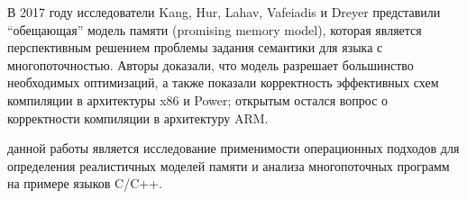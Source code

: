 В 2017 году исследователи Kang, Hur, Lahav, Vafeiadis и Dreyer
представили ``обещающая'' модель памяти (promising memory model), которая является перспективным
решением проблемы задания семантики для языка с многопоточностью. Авторы 
доказали, что модель разрешает большинство необходимых оптимизаций, а также показали корректность
эффективных схем компиляции в архитектуры x86 и Power; открытым остался вопрос о корректности компиляции
в архитектуру ARM.





{\aim} данной работы является исследование применимости операционных
подходов для определения реалистичных моделей памяти и анализа
многопоточных программ на примере языков C/C++.

